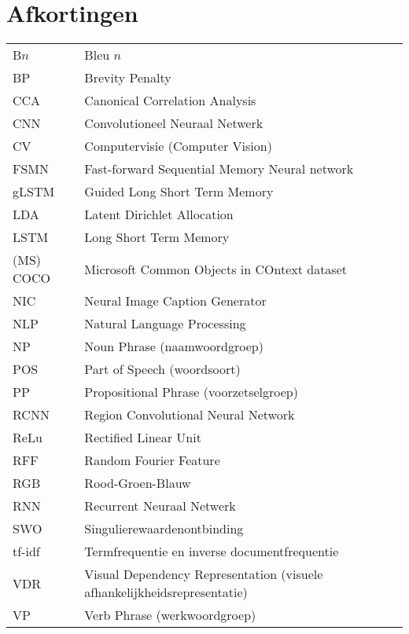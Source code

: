 \documentclass[master=cws,masteroption=ai]{kulemt}
\begin{document}
\section*{Afkortingen}
\begin{flushleft}
  \renewcommand{\arraystretch}{1.1}
  \begin{tabularx}{\textwidth}{@{}p{25mm}X@{}}
  	B$n$ & Bleu $n$\\
  	BP & Brevity Penalty\\
  	CCA & Canonical Correlation Analysis \\
  	CNN & Convolutioneel Neuraal Netwerk \\
  	CV & Computervisie (Computer Vision) \\
  	FSMN & Fast-forward Sequential Memory Neural network\\
  	gLSTM & Guided Long Short Term Memory \\
    LDA  & Latent Dirichlet Allocation \\
    LSTM & Long Short Term Memory \\
    (MS) COCO & Microsoft Common Objects in COntext dataset\\
    NIC & Neural Image Caption Generator~\cite{Google}\\
    NLP & Natural Language Processing\\
    NP & Noun Phrase (naamwoordgroep)\\
    POS & Part of Speech (woordsoort)\\
    PP & Propositional Phrase (voorzetselgroep)\\
    RCNN & Region Convolutional Neural Network \\
    ReLu & Rectified Linear Unit\\
    RFF & Random Fourier Feature \\
    RGB & Rood-Groen-Blauw\\
    RNN & Recurrent Neuraal Netwerk \\
    SWO & Singulierewaardenontbinding \\
    tf-idf & Termfrequentie en inverse documentfrequentie \\
	VDR & Visual Dependency Representation (visuele afhankelijkheidsrepresentatie)\\
	VP & Verb Phrase (werkwoordgroep)\\

  \end{tabularx}
\end{flushleft}
\end{document}
